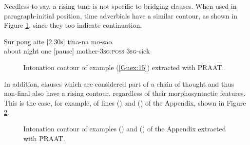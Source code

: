 \documentclass[output=paper]{LSP/langsci}
\begin{document}
Needless to say, a rising tune is not specific to bridging clauses. When used in paragraph-initial position, time adverbials have a similar  contour, as shown in Figure \ref{GuF5}, since they too indicate continuation. 

\begin{exe}
\ex \label{Guex:15}
\gll Sur     pong  aite [2.30s]   tina-na                mo-sao.\\     
about   night one      [pause]   mother-\textsc{3sg:poss}   \textsc{3sg}-sick \\
\glt {} 
\end{exe}

\begin{figure}[ht]
\caption{Intonation contour of example (\ref{Guex:15}) extracted with PRAAT. \label{GuF5}}
\end{figure}

In addition, clauses which are considered part of a chain of thought and thus non-final also have a rising  contour, regardless of their morphosyntactic features. This is the case, for example, of lines  () and () of the Appendix, shown in Figure \ref{GuF9}.

\begin{figure}[ht]
\caption{Intonation contour of examples () and () of the Appendix extracted with PRAAT. \label{GuF9}}
\end{figure}
\end{document}
